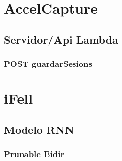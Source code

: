 \section{AccelCapture}
\subsection{Servidor/Api Lambda}\label{app:code:accelcapturelambda} 
\subsubsection{POST guardarSesions}


\section{iFell}
\subsection{Modelo RNN}
\subsubsection{Prunable Bidir}\label{app:code:ifell:prunebidir}


